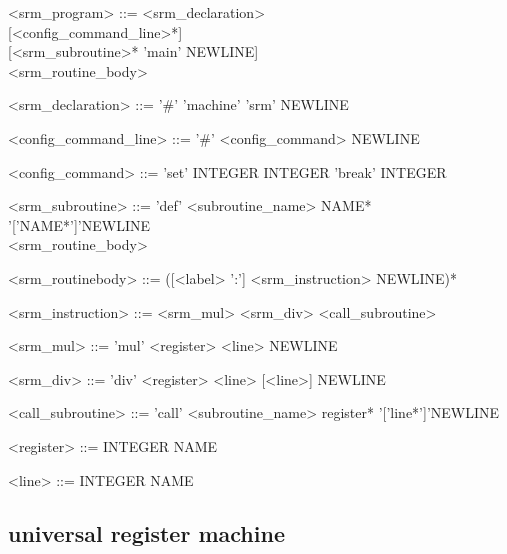 \begin{definition}
\hfill
\begin{grammar}
<srm\_program> ::= <srm\_declaration>\\{}[<config\_command\_line>*]\\{}[<srm\_subroutine>* 'main' NEWLINE]\\<srm\_routine\_body>

<srm\_declaration> ::= '\#' 'machine' 'srm' NEWLINE

<config\_command\_line> ::= '\#' <config\_command> NEWLINE

<config\_command> ::= 'set' INTEGER INTEGER
                 \alt 'break' INTEGER

<srm\_subroutine> ::= 'def' <subroutine\_name> NAME* '['NAME*']'NEWLINE\\<srm\_routine\_body> 

<srm\_routinebody> ::= ([<label> ':'] <srm\_instruction> NEWLINE)*

<srm\_instruction> ::= <srm\_mul>
                  \alt <srm\_div>
                  \alt <call\_subroutine>

<srm\_mul> ::= 'mul' <register> <line> NEWLINE

<srm\_div> ::= 'div' <register> <line> [<line>] NEWLINE

<call\_subroutine> ::= 'call' <subroutine\_name> register* '['line*']'NEWLINE

<register> ::= INTEGER
          \alt NAME

<line> ::= INTEGER
       \alt NAME
\end{grammar}
\end{definition}



\subsection{universal register machine}

